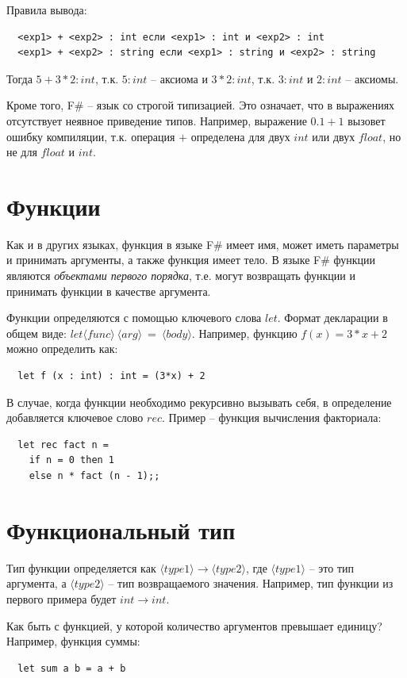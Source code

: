 \documentclass[a4paper,11pt]{article}
\begin{document}
Правила вывода:
\begin{lstlisting}
  <exp1> + <exp2> : int если <exp1> : int и <exp2> : int
  <exp1> + <exp2> : string если <exp1> : string и <exp2> : string
\end{lstlisting}

Тогда $5 + 3 * 2 : int$, т.к. $5 : int$ -- аксиома и $3 * 2 : int$, т.к.
$3 : int$ и $2 : int$ -- аксиомы.

Кроме того, F\# -- язык со строгой типизацией. Это означает, что в выражениях
отсутствует неявное приведение типов. Например, выражение $0.1 + 1$ вызовет
ошибку компиляции, т.к. операция $+$ определена для двух $int$ или двух $float$, но
не для $float$ и $int$.

\section{Функции}

Как и в других языках, функция в языке F\# имеет имя, может иметь параметры и 
принимать аргументы, а также функция имеет тело. В языке F\# функции являются
\emph{объектами первого порядка}, т.е. могут возвращать функции и принимать
функции в качестве аргумента.

Функции определяются с помощью ключевого слова $let$. Формат декларации в
общем виде: $let \langle func \rangle~\langle arg \rangle~=~\langle body
\rangle$. Например, функцию $f(x) = 3*x + 2$
можно определить как:
\begin{lstlisting}
  let f (x : int) : int = (3*x) + 2
\end{lstlisting}

В случае, когда функции необходимо рекурсивно вызывать себя, в определение
добавляется ключевое слово $rec$. Пример -- функция вычисления факториала:
\begin{lstlisting}
  let rec fact n =
    if n = 0 then 1
    else n * fact (n - 1);;
\end{lstlisting}

\section{Функциональный тип}

Тип функции определяется как $\langle type1 \rangle \rightarrow \langle type2 
\rangle$, где $\langle type1 \rangle$ -- это тип аргумента, а $\langle type2
\rangle$ -- тип возвращаемого значения. Например, тип функции из первого примера
будет $int \rightarrow int$.

Как быть с функцией, у которой количество аргументов превышает единицу? 
Например, функция суммы:
\begin{lstlisting}
  let sum a b = a + b
\end{lstlisting}
\end{document}

